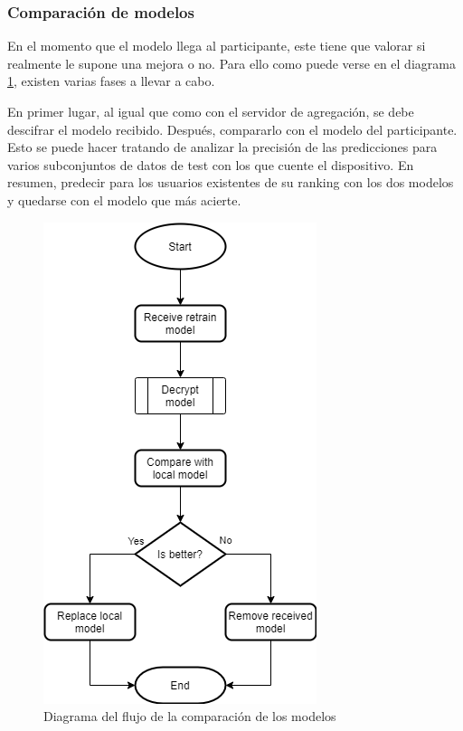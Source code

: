 \subsubsection{Comparación de modelos}
En el momento que el modelo llega al participante, este tiene que valorar si realmente le supone una mejora o no. Para ello como puede verse en el diagrama \ref{fig:Flow_Compare}, existen varias fases a llevar a cabo.

En primer lugar, al igual que como con el servidor de agregación, se debe descifrar el modelo recibido. Después, compararlo con el modelo del participante. Esto se puede hacer tratando de analizar la precisión de las predicciones para varios subconjuntos de datos de test con los que cuente el dispositivo. En resumen, predecir para los usuarios existentes de su ranking con los dos modelos y quedarse con el modelo que más acierte.

\begin{figure}[H]
    \centering
    \includegraphics[height=0.6\textheight]{Figuras/flowchart_compare.png}    
    \caption{Diagrama del flujo de la comparación de los modelos} 
    \label{fig:Flow_Compare}
\end{figure}
